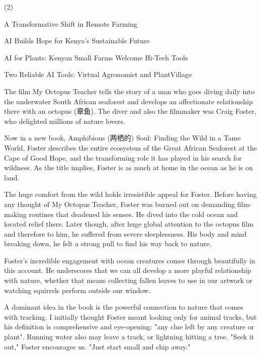 \documentclass{英语试卷}
\begin{document}
\begin{choices}(2)
  \item A Transformative Shift in Remote Farming
  \item AI Builds Hope for Kenya's Sustainable Future
  \item AI for Plants: Kenyan Small Farms Welcome Hi-Tech Tools
  \item Two Reliable AI Tools: Virtual Agronomist and PlantVillage
\end{choices}
\par The film My Octopus Teacher tells the story of a man who goes diving daily into the underwater South African seaforest and develops an affectionate relationship there with an octopus (章鱼). The diver and also the filmmaker was Craig Foster, who delighted millions of nature lovers.\par
\par Now in a new book, Amphibious (两栖的) Soul: Finding the Wild in a Tame World, Foster describes the entire ecosystem of the Great African Seaforest at the Cape of Good Hope, and the transforming role it has played in his search for wildness. As the title implies, Foster is as much at home in the ocean as he is on land.\par
\par The huge comfort from the wild holds irresistible appeal for Foster. Before having any thought of My Octopus Teacher, Foster was burned out on demanding film-making routines that deadened his senses. He dived into the cold ocean and located relief there. Later though, after huge global attention to the octopus film and therefore to him, he suffered from severe sleeplessness. His body and mind breaking down, he felt a strong pull to find his way back to nature.\par
\par Foster's incredible engagement with ocean creatures comes through beautifully in this account. He underscores that we can all develop a more playful relationship with nature, whether that means collecting fallen leaves to use in our artwork or watching squirrels perform outside our window.\par
\par A dominant idea in the book is the powerful connection to nature that comes with tracking. I initially thought Foster meant looking only for animal tracks, but his definition is comprehensive and eye-opening: "any clue left by any creature or plant". Running water also may leave a track, or lightning hitting a tree. "Seek it out," Foster encourages us. "Just start small and chip away."\par
\end{document}
